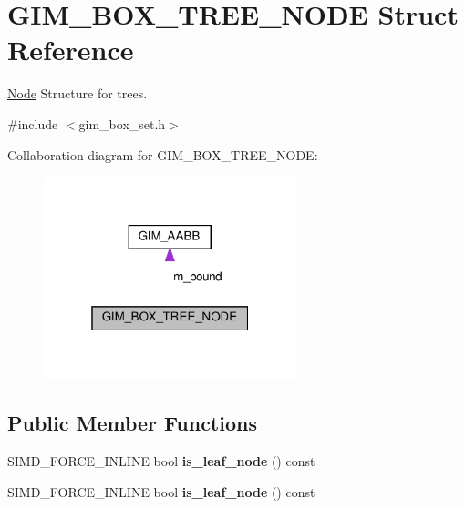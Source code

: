 \hypertarget{structGIM__BOX__TREE__NODE}{}\section{G\+I\+M\+\_\+\+B\+O\+X\+\_\+\+T\+R\+E\+E\+\_\+\+N\+O\+DE Struct Reference}
\label{structGIM__BOX__TREE__NODE}


\hyperlink{classNode}{Node} Structure for trees.  




{\ttfamily \#include $<$gim\+\_\+box\+\_\+set.\+h$>$}



Collaboration diagram for G\+I\+M\+\_\+\+B\+O\+X\+\_\+\+T\+R\+E\+E\+\_\+\+N\+O\+DE\+:
\nopagebreak
\begin{figure}[H]
\begin{center}
\leavevmode
\includegraphics[width=208pt]{structGIM__BOX__TREE__NODE__coll__graph}
\end{center}
\end{figure}
\subsection*{Public Member Functions}
\begin{DoxyCompactItemize}
\item 
\mbox{\label{structGIM__BOX__TREE__NODE_aa2e3bcc7628d6cf1ff55f79e467d46be}} 
S\+I\+M\+D\+\_\+\+F\+O\+R\+C\+E\+\_\+\+I\+N\+L\+I\+NE bool {\bfseries is\+\_\+leaf\+\_\+node} () const
\item 
\mbox{\label{structGIM__BOX__TREE__NODE_aa2e3bcc7628d6cf1ff55f79e467d46be}} 
S\+I\+M\+D\+\_\+\+F\+O\+R\+C\+E\+\_\+\+I\+N\+L\+I\+NE bool {\bfseries is\+\_\+leaf\+\_\+node} () const
\end{DoxyCompactItemize}
